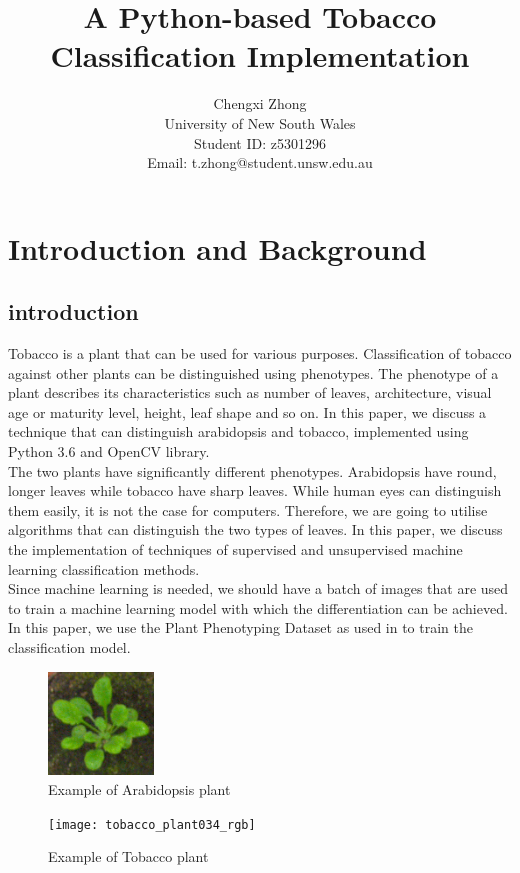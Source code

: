 \documentclass[9pt,technote]{IEEEtran}
\title{A Python-based Tobacco Classification Implementation}
\author{Chengxi Zhong\\ 
University of New South Wales\\ 
Student ID: z5301296\\
Email: t.zhong@student.unsw.edu.au
}
\begin{document}
\maketitle
\section{Introduction and Background}
\subsection{introduction}
Tobacco is a plant that can be used for various purposes. Classification of tobacco against other plants can be distinguished using phenotypes. The phenotype of a plant describes its characteristics such as number of leaves, architecture, visual age or maturity level, height, leaf shape and so on.\cite{Phenotyp28:online} In this paper, we discuss a technique that can distinguish arabidopsis and tobacco, implemented using Python 3.6 and OpenCV\cite{OpenCV87:online} library.\\

The two plants have significantly different phenotypes. Arabidopsis have round, longer leaves while tobacco have sharp leaves. While human eyes can distinguish them easily, it is not the case for computers. Therefore, we are going to utilise algorithms that can distinguish the two types of leaves. In this paper, we discuss the implementation of techniques of supervised and unsupervised machine learning classification methods.\\

Since machine learning is needed, we should have a batch of images that are used to train a machine learning model with which the differentiation can be achieved. In this paper, we use the Plant Phenotyping Dataset as used in \cite{minervini2016finely} to train the classification model.
\begin{figure}[h!]
  \centering
  \includegraphics[width=0.25\textwidth]{ara2012_plant008_rgb}
  \caption{Example of Arabidopsis plant}
\end{figure}
\begin{figure}[h!]
  \centering
  \texttt{[image: tobacco\_plant034\_rgb]}
  \caption{Example of Tobacco plant}
\end{figure}
\end{document}
